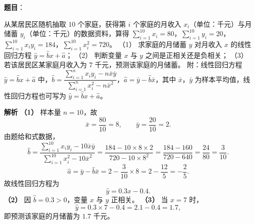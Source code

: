 \begin{answer}

\textbf{题目}：

从某居民区随机抽取 $10$ 个家庭，获得第 $i$ 个家庭的月收入 $x_i$（单位：千元）与月储蓄 $y_i$（单位：千元）的数据资料，算得 $\sum\limits_{i=1}^{10}x_i=80$，$\sum\limits_{i=1}^{10}y_i=20$，$\sum\limits_{i=1}^{10}x_iy_i=184$，$\sum\limits_{i=1}^{10}x_i^2=720$。
（1） 求家庭的月储蓄 $y$ 对月收入 $x$ 的线性回归方程 $\hat y=\hat bx+\hat a$；
（2） 判断变量 $x$ 与 $y$ 之间是正相关还是负相关；
（3） 若该居民区某家庭月收入为 $7$ 千元，预测该家庭的月储蓄。
附：线性回归方程 $\hat y=\hat bx+\hat a$ 中，$\hat b=\dfrac{\sum\limits_{i=1}^n x_iy_i-n\bar x\bar y}{\sum\limits_{i=1}^n x_i^2-n\bar x^2}$，$\hat a=\bar y-\hat b\bar x$，其中 $\bar x$，$\bar y$ 为样本平均值，线性回归方程也可写为 $\hat y=\hat bx+\hat a$。

\textbf{解析}
\textbf{（1）} 样本量 $n=10$，故
\nopagebreak[4]
\[\bar x=\frac{80}{10}=8,\qquad \bar y=\frac{20}{10}=2.\]
由题给和式数据，
\nopagebreak[4]
\[\hat b=\frac{\sum\limits_{i=1}^{10}x_iy_i-10\bar x\bar y}{\sum\limits_{i=1}^{10}x_i^2-10\bar x^2}
=\frac{184-10\times8\times2}{720-10\times8^2}
=\frac{184-160}{720-640}=\frac{24}{80}=\frac3{10}.\]
\nopagebreak[4]
\[\hat a=\bar y-\hat b\bar x=2-\frac3{10}\times8=2-\frac{12}5=-\frac25.\]
故线性回归方程为
\nopagebreak[4]
\[\hat y=0.3x-0.4.\]
\textbf{（2）} 因 $\hat b=0.3>0$，变量 $x$ 与 $y$ 正相关。
\textbf{（3）} 当 $x=7$ 时，
\nopagebreak[4]
\[\hat y=0.3\times7-0.4=2.1-0.4=1.7,\]
即预测该家庭的月储蓄为 $1.7$ 千元。




\end{answer}
